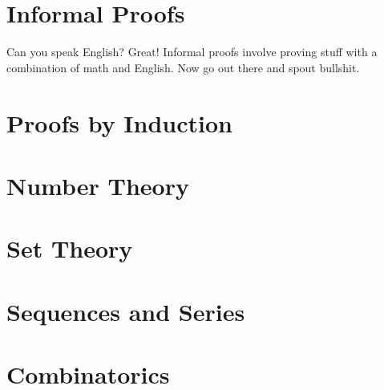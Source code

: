 \documentclass[a4paper]{article}
\begin{document}
\begin{multicols}{2}

	\section{Informal Proofs}
	Can you speak English? Great! Informal proofs involve
	proving stuff with a combination of math and English.
	Now go out there and spout bullshit.

	\section{Proofs by Induction}

	\section{Number Theory}

	\section{Set Theory}

	\section{Sequences and Series}

	\section{Combinatorics}

\end{multicols}
\end{document}
